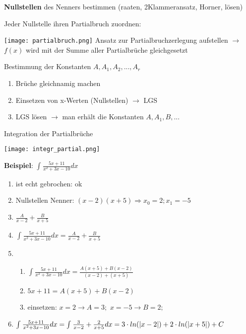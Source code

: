 \begin{multicols*}{3}
    { \textbf{Nullstellen} des Nenners bestimmen (raaten, 2Klammeransatz, Horner, lösen)}

    { Jeder Nullstelle ihren Partialbruch zuordnen:}

    \texttt{[image: partialbruch.png]}
    { Ansatz zur Partialbruchzerlegung aufstellen $\rightarrow$ $f(x)$ wird mit der Summe aller Partialbrüche gleichgesetzt}

    { Bestimmung der Konstanten $A,A_1,A_2,...,A_r$}
    \begin{enumerate}
        \itemsep0em
        \item Brüche gleichnamig machen
        \item Einsetzen von x-Werten (Nullstellen) $\rightarrow$ LGS
        \item LGS lösen $\rightarrow$ man erhält die Konstanten $A,A_1,B,...$
    \end{enumerate}


    { Integration der Partialbrüche}

    \texttt{[image: integr\_partial.png]}

    {\textbf{Beispiel}: \large $\int_{}^{}\frac{5x+11}{x^2+3x-10}dx $ }
    \begin{enumerate}
        \itemsep-0.3em
        \item ist echt gebrochen: ok
        \item Nullstellen Nenner: $ (x-2)(x+5) \Rightarrow x_0 = 2; x_1 = -5$
        \item $ \frac{A}{x-2}+\frac{B}{x+5}$
        \item \large $\int_{}^{}\frac{5x+11}{x^2+3x-10}dx  = \frac{A}{x-2}+\frac{B}{x+5}$
        \item     \begin{enumerate}
                  \itemsep-0.3em
                  \item    $\int_{}^{}\frac{5x+11}{x^2+3x-10}dx = \frac{A(x+5)+B(x-2)}{(x-2) +(x+5) }$
                  \item \small $5x + 11 = A(x+5)+B(x-2) $
                  \item  {\small einsetzen:  $ x = 2 \rightarrow A=3; $ $ x = -5 \rightarrow B=2; $}
              \end{enumerate}
        \item  $\int_{}^{}\frac{5x+11}{x^2+3x-10}dx =\int_{}^{}\frac{3}{x-2}+\frac{2}{x+5}dx  \newline = 3\cdot ln(|x-2|) + 2\cdot ln(|x+5|) + C $
    \end{enumerate}


\end{multicols*}
